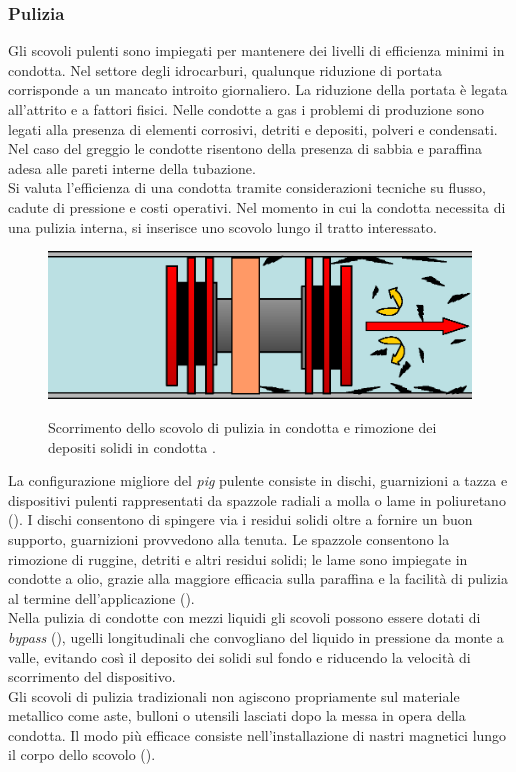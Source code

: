 \subsubsection{Pulizia}
Gli scovoli pulenti sono impiegati per mantenere dei livelli di efficienza minimi in condotta. Nel settore degli idrocarburi, qualunque riduzione di portata corrisponde a un mancato introito giornaliero. La riduzione della portata è legata all'attrito e a fattori fisici. Nelle condotte a gas i problemi di produzione sono legati alla presenza di elementi corrosivi, detriti e depositi, polveri e condensati. Nel caso del greggio le condotte risentono della presenza di sabbia e paraffina adesa alle pareti interne della tubazione.\\
Si valuta l'efficienza di una condotta tramite considerazioni tecniche su flusso, cadute di pressione e costi operativi. Nel momento in cui la condotta necessita di una pulizia interna, si inserisce uno scovolo lungo il tratto interessato.\\
\begin{figure}[htbp]
	\centering
	\includegraphics[width=.7\textwidth]{fig/pig/cleaning.eps}
	\label{fig:cleaningpig}
	\caption{Scorrimento dello scovolo di pulizia in condotta e rimozione dei depositi solidi in condotta \parencite{davidson2002introduction}.}
\end{figure}
La configurazione migliore del \textit{pig} pulente consiste in dischi, guarnizioni a tazza e dispositivi pulenti rappresentati da spazzole radiali a molla o lame in poliuretano (). I dischi consentono di spingere via i residui solidi oltre a fornire un buon supporto, guarnizioni provvedono alla tenuta. Le spazzole consentono la rimozione di ruggine, detriti e altri residui solidi; le lame sono impiegate in condotte a olio, grazie alla maggiore efficacia sulla paraffina e la facilità di pulizia al termine dell'applicazione (). \\
Nella pulizia di condotte con mezzi liquidi gli scovoli possono essere dotati di \textit{bypass} (), ugelli longitudinali che convogliano del liquido in pressione da monte a valle, evitando così il deposito dei solidi sul fondo e riducendo la velocità di scorrimento del dispositivo.\\
Gli scovoli di pulizia tradizionali non agiscono propriamente sul materiale metallico come aste, bulloni o utensili lasciati dopo la messa in opera della condotta. Il modo più efficace consiste nell'installazione di nastri magnetici lungo il corpo dello scovolo (). 

